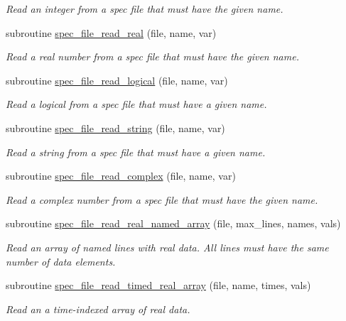 \begin{DoxyCompactItemize}
\begin{DoxyCompactList}\small\item\em Read an integer from a spec file that must have the given name. \end{DoxyCompactList}\item 
subroutine \mbox{\hyperlink{namespacepmc__spec__file_a2e83c0bd910f7d477fd5b5b7f6bb056b}{spec\+\_\+file\+\_\+read\+\_\+real}} (file, name, var)
\begin{DoxyCompactList}\small\item\em Read a real number from a spec file that must have the given name. \end{DoxyCompactList}\item 
subroutine \mbox{\hyperlink{namespacepmc__spec__file_a4ad9aabbf3f21185cd6a140d2a237930}{spec\+\_\+file\+\_\+read\+\_\+logical}} (file, name, var)
\begin{DoxyCompactList}\small\item\em Read a logical from a spec file that must have a given name. \end{DoxyCompactList}\item 
subroutine \mbox{\hyperlink{namespacepmc__spec__file_aac30a013e7ca64803b5190439f924626}{spec\+\_\+file\+\_\+read\+\_\+string}} (file, name, var)
\begin{DoxyCompactList}\small\item\em Read a string from a spec file that must have a given name. \end{DoxyCompactList}\item 
subroutine \mbox{\hyperlink{namespacepmc__spec__file_a94e4dc72801e7c59f87a9df27ac7e417}{spec\+\_\+file\+\_\+read\+\_\+complex}} (file, name, var)
\begin{DoxyCompactList}\small\item\em Read a complex number from a spec file that must have the given name. \end{DoxyCompactList}\item 
subroutine \mbox{\hyperlink{namespacepmc__spec__file_aaa4270afb530ff92767b3892d3a6e553}{spec\+\_\+file\+\_\+read\+\_\+real\+\_\+named\+\_\+array}} (file, max\+\_\+lines, names, vals)
\begin{DoxyCompactList}\small\item\em Read an array of named lines with real data. All lines must have the same number of data elements. \end{DoxyCompactList}\item 
subroutine \mbox{\hyperlink{namespacepmc__spec__file_a6b4270f4f50e810affcab6aecd42e867}{spec\+\_\+file\+\_\+read\+\_\+timed\+\_\+real\+\_\+array}} (file, name, times, vals)
\begin{DoxyCompactList}\small\item\em Read an a time-\/indexed array of real data. \end{DoxyCompactList}\end{DoxyCompactItemize}
